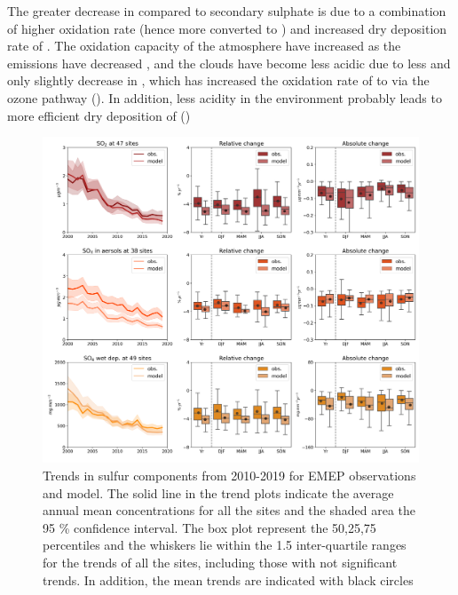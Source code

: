 The  greater decrease in \soii compared to secondary sulphate is due to a combination of higher oxidation rate (hence more \soii converted to \soiv) and increased dry deposition rate of \soii. The oxidation capacity of the atmosphere have increased as the emissions have decreased \cite{Dalsoren2016}, and the clouds have become less acidic due to less \soii and only slightly decrease in \nhiii, which has increased the oxidation rate of \soii to \soiv via the ozone pathway (\cite{Banzhaf2015, Redington2009}). In addition, less acidity in the environment probably leads to more efficient dry deposition of \soii (\cite{Fowler_et_al:2009}) 




\begin{figure}
	\centering
	\includegraphics[width=0.74\paperwidth]{FIGS_TRENDS/sulfur_trends.png}
	\caption{\label{fig:SOx_trends}Trends in sulfur components from 2010-2019 for EMEP observations and model. The solid line in the trend plots indicate the average annual mean concentrations for all the sites and the shaded area the 95 \% confidence interval. The box plot represent the 50,25,75 percentiles and the whiskers lie within the 1.5 inter-quartile ranges for the trends of all the sites, including those with not significant trends. In addition, the mean trends are indicated with black circles}
\end{figure}


